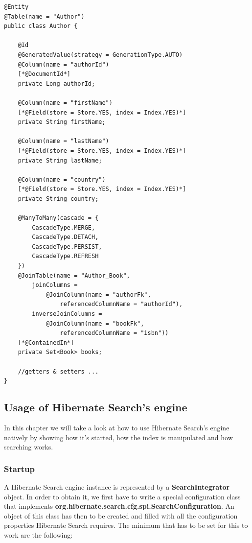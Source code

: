 \pagebreak

\lstset{language=java}
\begin{lstlisting}[frame=htrbl, caption={Author.java with Hibernate Search annotations}, label={lst:author.java_2}]
@Entity
@Table(name = "Author")
public class Author {

	@Id
	@GeneratedValue(strategy = GenerationType.AUTO)
	@Column(name = "authorId")
	[*@DocumentId*]
	private Long authorId;
	
	@Column(name = "firstName")
	[*@Field(store = Store.YES, index = Index.YES)*]
	private String firstName;
	
	@Column(name = "lastName")
	[*@Field(store = Store.YES, index = Index.YES)*]
	private String lastName;
	
	@Column(name = "country")
	[*@Field(store = Store.YES, index = Index.YES)*]
	private String country;
	
	@ManyToMany(cascade = {
		CascadeType.MERGE, 
		CascadeType.DETACH, 
		CascadeType.PERSIST, 
		CascadeType.REFRESH
	})
	@JoinTable(name = "Author_Book", 
		joinColumns = 
			@JoinColumn(name = "authorFk", 
				referencedColumnName = "authorId"),
		inverseJoinColumns = 
			@JoinColumn(name = "bookFk", 
				referencedColumnName = "isbn"))
	[*@ContainedIn*]
	private Set<Book> books;
	
	//getters & setters ...
}
\end{lstlisting}

\pagebreak

\subsection{Usage of Hibernate Search's engine} \label{using_hsearch_engine}
In this chapter we will take a look at how to use Hibernate Search's engine natively by showing how it's started, how the index is manipulated and how searching works.

\subsubsection{Startup}
A Hibernate Search engine instance is represented by a \textbf{SearchIntegrator} object. In order to obtain it, we first have to write a special configuration class that implements \textbf{org.hibernate.search.cfg.spi.SearchConfiguration}. An object of this class has then to be created and filled with all the configuration properties Hibernate Search requires. The minimum that has to be set for this to work are the following:

